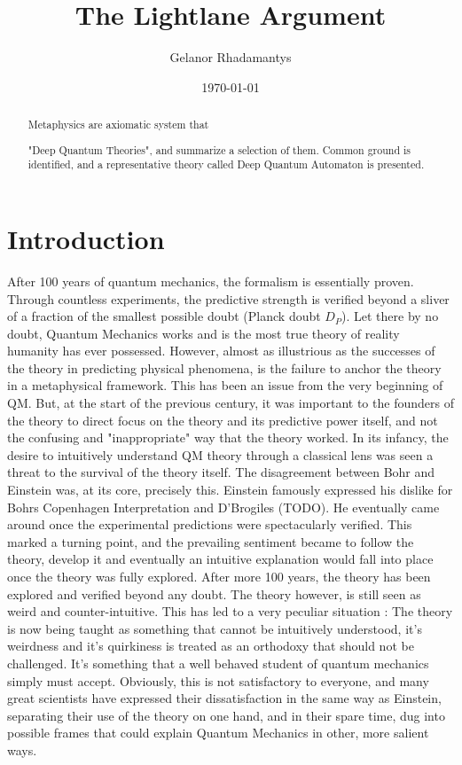 \documentclass[notitlepage]{report}
\title{The Lightlane Argument}
\author{Gelanor Rhadamantys}
\date{\today}
\begin{document}
\maketitle
\thispagestyle{empty}

\begin{abstract}
Metaphysics are axiomatic system that 



"Deep Quantum Theories", and summarize a selection of them. Common ground is identified, and a representative theory called Deep Quantum Automaton is presented.


\end{abstract}

\section*{Introduction}
After 100 years of quantum mechanics, the formalism is essentially proven. Through countless experiments, the predictive strength is verified beyond a sliver of a fraction of the smallest possible doubt (Planck doubt $D_P$). Let there by no doubt, Quantum Mechanics works and is the most true theory of reality humanity has ever possessed. However, almost as illustrious as the successes of the theory in predicting physical phenomena, is the failure to anchor the theory in a metaphysical framework. This has been an issue from the very beginning of QM. But, at the start of the previous century, it was important to the founders of the theory to direct focus on the theory and its predictive power itself, and not the confusing and "inappropriate" way that the theory worked. In its infancy, the desire to intuitively understand QM theory through a classical lens was seen a threat to the survival of the theory itself. The disagreement between Bohr and Einstein was, at its core, precisely this. Einstein famously expressed his dislike for Bohrs Copenhagen Interpretation and D'Brogiles (TODO). He eventually came around once the experimental predictions were spectacularly verified. This marked a turning point, and the prevailing sentiment became to follow the theory, develop it and eventually an intuitive explanation would fall into place once the theory was fully explored.
After more 100 years, the theory has been explored and verified beyond any doubt. The theory however, is still seen as weird and counter-intuitive. This has led to a very peculiar situation : The theory is now being taught as something that cannot be intuitively understood, it's weirdness and it's quirkiness is treated as an orthodoxy that should not be challenged. It's something that a well behaved student of quantum mechanics simply must accept. Obviously, this is not satisfactory to everyone, and many great scientists have expressed their dissatisfaction in the same way as Einstein, separating their use of the theory on one hand, and in their spare time, dug into possible frames that could explain Quantum Mechanics in other, more salient ways.
\end{document}
